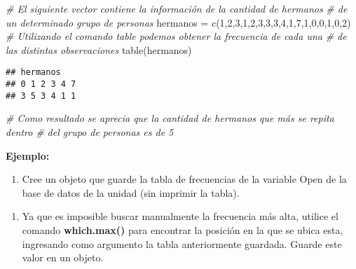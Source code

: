 \documentclass[
]{book}
\newenvironment{Shaded}{\begin{snugshade}}{\end{snugshade}}
\newcommand{\CommentTok}[1]{\textcolor[rgb]{0.56,0.35,0.01}{\textit{#1}}}
\newcommand{\DecValTok}[1]{\textcolor[rgb]{0.00,0.00,0.81}{#1}}
\newcommand{\FunctionTok}[1]{\textcolor[rgb]{0.00,0.00,0.00}{#1}}
\newcommand{\NormalTok}[1]{#1}
\newcommand{\OtherTok}[1]{\textcolor[rgb]{0.56,0.35,0.01}{#1}}
\newcommand{\SpecialCharTok}[1]{\textcolor[rgb]{0.00,0.00,0.00}{#1}}
\providecommand{\tightlist}{%
  \setlength{\itemsep}{0pt}\setlength{\parskip}{0pt}}
\begin{document}
\begin{Shaded}
\begin{Highlighting}[]
\CommentTok{\# El siguiente vector contiene la información de la cantidad de hermanos }
\CommentTok{\# de un determinado grupo de personas}
\NormalTok{hermanos }\OtherTok{=} \FunctionTok{c}\NormalTok{(}\DecValTok{1}\NormalTok{,}\DecValTok{2}\NormalTok{,}\DecValTok{3}\NormalTok{,}\DecValTok{1}\NormalTok{,}\DecValTok{2}\NormalTok{,}\DecValTok{3}\NormalTok{,}\DecValTok{3}\NormalTok{,}\DecValTok{3}\NormalTok{,}\DecValTok{4}\NormalTok{,}\DecValTok{1}\NormalTok{,}\DecValTok{7}\NormalTok{,}\DecValTok{1}\NormalTok{,}\DecValTok{0}\NormalTok{,}\DecValTok{0}\NormalTok{,}\DecValTok{1}\NormalTok{,}\DecValTok{0}\NormalTok{,}\DecValTok{2}\NormalTok{)}
\CommentTok{\# Utilizando el comando table podemos obtener la frecuencia de cada una }
\CommentTok{\# de las distintas observaciones}
\FunctionTok{table}\NormalTok{(hermanos)}
\end{Highlighting}
\end{Shaded}

\begin{verbatim}
## hermanos
## 0 1 2 3 4 7 
## 3 5 3 4 1 1
\end{verbatim}

\begin{Shaded}
\begin{Highlighting}[]
\CommentTok{\# Como resultado se aprecia que la cantidad de hermanos que más se repita dentro }
\CommentTok{\# del grupo de personas es de 5}
\end{Highlighting}
\end{Shaded}

\textbf{Ejemplo:}

\begin{enumerate}
\def\labelenumi{\arabic{enumi}.}
\tightlist
\item
  Cree un objeto que guarde la tabla de frecuencias de la variable Open de la base de datos de la unidad (sin imprimir la tabla).
\end{enumerate}

\begin{Shaded}
\end{Shaded}

\begin{enumerate}
\def\labelenumi{\arabic{enumi}.}
\setcounter{enumi}{1}
\tightlist
\item
  Ya que es imposible buscar manualmente la frecuencia más alta, utilice el comando \textbf{which.max()} para encontrar la posición en la que se ubica esta, ingresando como argumento la tabla anteriormente guardada. Guarde este valor en un objeto.
\end{enumerate}
\end{document}

